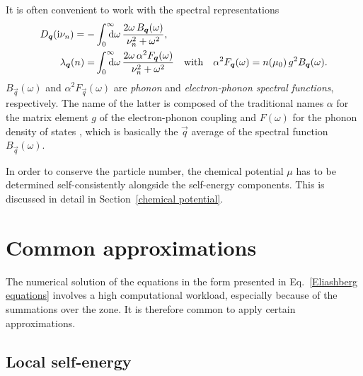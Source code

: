 It is often convenient to work with the spectral representations
%
\begin{align*}
    D_{\vec q}(\I \nu_n) = -&\int \from 0 \till \infty \D \omega \,
        \frac{2 \omega \, B_{\vec q}(\omega)}{\nu_n^2 + \omega^2},
    \\
    \lambda_{\vec q}(n) = &\int \from 0 \till \infty \D \omega \,
        \frac{2 \omega \, \alpha^2 F_{\vec q}(\omega)}{\nu_n^2 + \omega^2}
    \quad \text{with} \quad
    \alpha^2 F_{\vec q}(\omega) = n(\mu_0) \, g^2 B_{\vec q}(\omega).
\end{align*}
%
$B_{\vec q}(\omega)$ and $\alpha^2 F_{\vec q}(\omega)$ are \emph{phonon} and
\emph{electron-phonon spectral functions}, respectively. The name of the latter
is composed of the traditional names $\alpha$ for the matrix element $g$ of the
electron-phonon coupling \cite[Eq.~1, e.g.]{Migdal58} and $F(\omega)$ for the
phonon density of states \cite[16]{AllenMitrovic82}, which is basically the
$\vec q$ average of the spectral function $B_{\vec q}(\omega)$.

In order to conserve the particle number, the chemical potential $\mu$ has to be
determined self-consistently alongside the self-energy components. This is
discussed in detail in Section~\ref{chemical potential}.

\section{Common approximations}

The numerical solution of the  equations in the form presented
in Eq.~\ref{Eliashberg equations} involves a high computational workload,
especially because of the summations over the  zone. It is
therefore common to apply certain approximations.

\subsection{Local self-energy}


